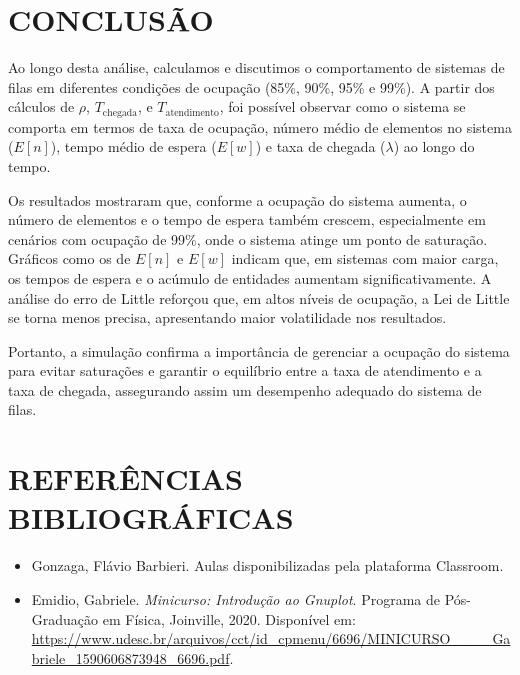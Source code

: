 
\section{CONCLUSÃO}
Ao longo desta análise, calculamos e discutimos o comportamento de sistemas de filas em diferentes condições de ocupação (85\%, 90\%, 95\% e 99\%). A partir dos cálculos de $\rho$, $T_{\text{chegada}}$, e $T_{\text{atendimento}}$, foi possível observar como o sistema se comporta em termos de taxa de ocupação, número médio de elementos no sistema ($E[n]$), tempo médio de espera ($E[w]$) e taxa de chegada ($\lambda$) ao longo do tempo.

Os resultados mostraram que, conforme a ocupação do sistema aumenta, o número de elementos e o tempo de espera também crescem, especialmente em cenários com ocupação de 99\%, onde o sistema atinge um ponto de saturação. Gráficos como os de $E[n]$ e $E[w]$ indicam que, em sistemas com maior carga, os tempos de espera e o acúmulo de entidades aumentam significativamente. A análise do erro de Little reforçou que, em altos níveis de ocupação, a Lei de Little se torna menos precisa, apresentando maior volatilidade nos resultados.

Portanto, a simulação confirma a importância de gerenciar a ocupação do sistema para evitar saturações e garantir o equilíbrio entre a taxa de atendimento e a taxa de chegada, assegurando assim um desempenho adequado do sistema de filas.

\section{REFERÊNCIAS BIBLIOGRÁFICAS}

\begin{itemize} 
\item Gonzaga, Flávio Barbieri. Aulas disponibilizadas pela plataforma Classroom. 
 \item Emidio, Gabriele. \textit{Minicurso: Introdução ao Gnuplot}. Programa de Pós-Graduação em Física, Joinville, 2020. Disponível em: \url{https://www.udesc.br/arquivos/cct/id_cpmenu/6696/MINICURSO____Gabriele_1590606873948_6696.pdf}. 
 \end{itemize}